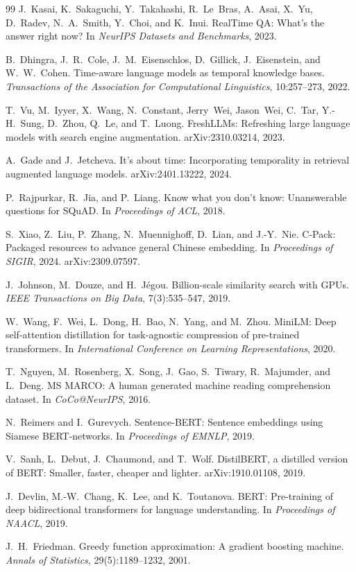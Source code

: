 \documentclass[11pt]{article}
\begin{document}
\begin{thebibliography}{99}
J.~Kasai, K.~Sakaguchi, Y.~Takahashi, R.~Le~Bras, A.~Asai, X.~Yu, D.~Radev, N.~A.~Smith, Y.~Choi, and K.~Inui.
RealTime QA: What's the answer right now?
In \emph{NeurIPS Datasets and Benchmarks}, 2023.

B.~Dhingra, J.~R.~Cole, J.~M.~Eisenschlos, D.~Gillick, J.~Eisenstein, and W.~W.~Cohen.
Time-aware language models as temporal knowledge bases.
\emph{Transactions of the Association for Computational Linguistics}, 10:257--273, 2022.

T.~Vu, M.~Iyyer, X.~Wang, N.~Constant, Jerry~Wei, Jason~Wei, C.~Tar, Y.-H.~Sung, D.~Zhou, Q.~Le, and T.~Luong.
FreshLLMs: Refreshing large language models with search engine augmentation.
arXiv:2310.03214, 2023.

A.~Gade and J.~Jetcheva.
It's about time: Incorporating temporality in retrieval augmented language models.
arXiv:2401.13222, 2024.

P.~Rajpurkar, R.~Jia, and P.~Liang.
Know what you don't know: Unanswerable questions for SQuAD.
In \emph{Proceedings of ACL}, 2018.

S.~Xiao, Z.~Liu, P.~Zhang, N.~Muennighoff, D.~Lian, and J.-Y.~Nie.
C-Pack: Packaged resources to advance general Chinese embedding.
In \emph{Proceedings of SIGIR}, 2024.
arXiv:2309.07597.

J.~Johnson, M.~Douze, and H.~J\'egou.
Billion-scale similarity search with GPUs.
\emph{IEEE Transactions on Big Data}, 7(3):535--547, 2019.

W.~Wang, F.~Wei, L.~Dong, H.~Bao, N.~Yang, and M.~Zhou.
MiniLM: Deep self-attention distillation for task-agnostic compression of pre-trained transformers.
In \emph{International Conference on Learning Representations}, 2020.

T.~Nguyen, M.~Rosenberg, X.~Song, J.~Gao, S.~Tiwary, R.~Majumder, and L.~Deng.
MS MARCO: A human generated machine reading comprehension dataset.
In \emph{CoCo@NeurIPS}, 2016.

N.~Reimers and I.~Gurevych.
Sentence-BERT: Sentence embeddings using Siamese BERT-networks.
In \emph{Proceedings of EMNLP}, 2019.

V.~Sanh, L.~Debut, J.~Chaumond, and T.~Wolf.
DistilBERT, a distilled version of BERT: Smaller, faster, cheaper and lighter.
arXiv:1910.01108, 2019.

J.~Devlin, M.-W.~Chang, K.~Lee, and K.~Toutanova.
BERT: Pre-training of deep bidirectional transformers for language understanding.
In \emph{Proceedings of NAACL}, 2019.

J.~H.~Friedman.
Greedy function approximation: A gradient boosting machine.
\emph{Annals of Statistics}, 29(5):1189--1232, 2001.

\end{thebibliography}
\end{document}
